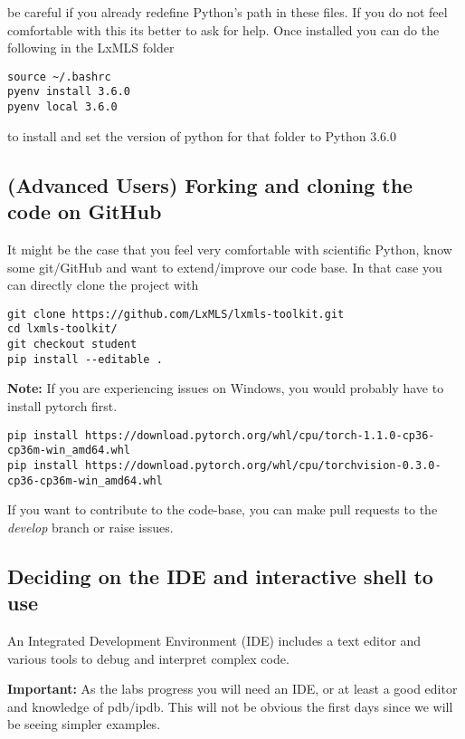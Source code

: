 be careful if you already redefine Python's path in these files. If you do not feel comfortable with this its better to ask for help. Once installed you can do the following in the LxMLS folder

\begin{verbatim}
source ~/.bashrc
pyenv install 3.6.0 
pyenv local 3.6.0
\end{verbatim}

\noindent to install and set the version of python for that folder to Python 3.6.0


\subsection{(Advanced Users) Forking and cloning the code on GitHub}

It might be the case that you feel very comfortable with scientific Python, know some git/GitHub and want to extend/improve our code base. In that case you can directly clone the project with

\begin{verbatim}
git clone https://github.com/LxMLS/lxmls-toolkit.git 
cd lxmls-toolkit/
git checkout student
pip install --editable .
\end{verbatim}

\textbf{Note:}
\noindent If you are experiencing issues on Windows, you would probably have to install pytorch first.
\begin{verbatim} 
pip install https://download.pytorch.org/whl/cpu/torch-1.1.0-cp36-cp36m-win_amd64.whl
pip install https://download.pytorch.org/whl/cpu/torchvision-0.3.0-cp36-cp36m-win_amd64.whl
\end{verbatim}

\noindent If you want to contribute to the code-base, you can make pull requests to the \textit{develop} branch or raise issues.

\subsection{Deciding on the IDE and interactive shell to use}

An Integrated Development Environment (IDE) includes a text editor and various tools to debug and interpret complex code. 

\textbf{Important:} As the labs progress you will need an IDE, or at least a good editor and knowledge of pdb/ipdb. This will not be obvious the first days since we will be seeing simpler examples.

